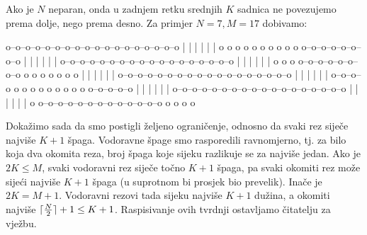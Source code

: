 Ako je $N$ neparan, onda u zadnjem retku srednjih $K$ sadnica ne povezujemo
prema dolje, nego prema desno. Za primjer $N = 7, M = 17$ dobivamo:

\begin{verbbox}
o--o--o--o--o--o--o--o--o--o--o--o--o--o--o--o--o--o
|  |  |  |  |                                      |
o  o  o  o  o  o  o  o  o  o  o--o--o--o--o--o--o--o
               |  |  |  |  |                       |
o--o--o--o--o--o--o--o--o--o--o--o--o--o--o--o--o--o
                              |  |  |  |  |        |
o  o  o  o--o--o--o--o--o--o--o  o  o  o  o  o  o  o
|  |  |                                      |  |  |
o--o--o--o--o--o--o--o--o--o--o--o--o--o--o--o--o--o
         |  |  |  |  |                             |
o--o--o--o  o  o  o  o  o  o  o  o  o  o--o--o--o--o
                        |  |  |  |  |              |
o--o--o--o--o--o--o--o--o--o--o--o--o--o--o--o--o--o
|                                      |  |  |  |  |
o  o--o--o--o--o--o--o--o--o--o--o--o--o  o  o  o  o
\end{verbbox}
\begin{figure}[H]
  \centering
  \theverbbox
\end{figure}

Dokažimo sada da smo postigli željeno ograničenje, odnosno da svaki rez siječe
najviše $K + 1$ špaga. Vodoravne špage smo rasporedili ravnomjerno, tj. za bilo
koja dva okomita reza, broj špaga koje sijeku razlikuje se za najviše jedan.
Ako je $2K \leq M$, svaki vodoravni rez siječe točno $K + 1$ špaga, pa svaki
okomiti rez može sijeći najviše $K + 1$ špaga (u suprotnom bi prosjek bio
prevelik). Inače je $2K = M + 1$. Vodoravni rezovi tada sijeku najviše $K + 1$
dužina, a okomiti najviše $\lceil\frac{N}{2}\rceil + 1 \leq K + 1$. Raspisivanje ovih
tvrdnji ostavljamo čitatelju za vježbu.
